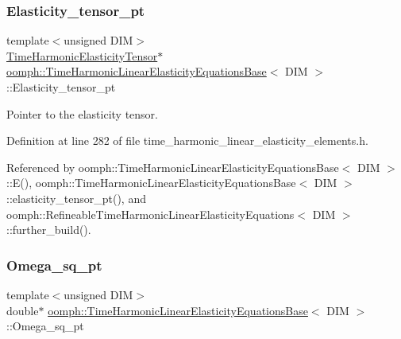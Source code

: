 \subsubsection{\texorpdfstring{Elasticity\+\_\+tensor\+\_\+pt}{Elasticity\_tensor\_pt}}
{\footnotesize\ttfamily template$<$unsigned D\+IM$>$ \\
\hyperlink{classoomph_1_1TimeHarmonicElasticityTensor}{Time\+Harmonic\+Elasticity\+Tensor}$\ast$ \hyperlink{classoomph_1_1TimeHarmonicLinearElasticityEquationsBase}{oomph\+::\+Time\+Harmonic\+Linear\+Elasticity\+Equations\+Base}$<$ D\+IM $>$\+::Elasticity\+\_\+tensor\+\_\+pt\hspace{0.3cm}{\ttfamily [protected]}}



Pointer to the elasticity tensor. 



Definition at line 282 of file time\+\_\+harmonic\+\_\+linear\+\_\+elasticity\+\_\+elements.\+h.



Referenced by oomph\+::\+Time\+Harmonic\+Linear\+Elasticity\+Equations\+Base$<$ D\+I\+M $>$\+::\+E(), oomph\+::\+Time\+Harmonic\+Linear\+Elasticity\+Equations\+Base$<$ D\+I\+M $>$\+::elasticity\+\_\+tensor\+\_\+pt(), and oomph\+::\+Refineable\+Time\+Harmonic\+Linear\+Elasticity\+Equations$<$ D\+I\+M $>$\+::further\+\_\+build().

\mbox{\label{classoomph_1_1TimeHarmonicLinearElasticityEquationsBase_a0d9d2b717af2ef592334f23875297d69}} 
\subsubsection{\texorpdfstring{Omega\+\_\+sq\+\_\+pt}{Omega\_sq\_pt}}
{\footnotesize\ttfamily template$<$unsigned D\+IM$>$ \\
double$\ast$ \hyperlink{classoomph_1_1TimeHarmonicLinearElasticityEquationsBase}{oomph\+::\+Time\+Harmonic\+Linear\+Elasticity\+Equations\+Base}$<$ D\+IM $>$\+::Omega\+\_\+sq\+\_\+pt\hspace{0.3cm}{\ttfamily [protected]}}



